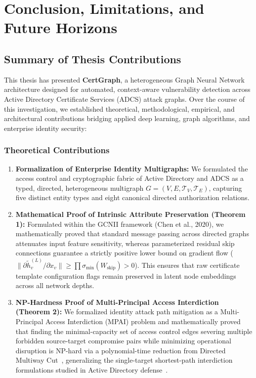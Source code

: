 \chapter{Conclusion, Limitations, and Future Horizons}
\label{ch:conclusion}

\section{Summary of Thesis Contributions}
This thesis has presented \textbf{CertGraph}, a heterogeneous Graph Neural Network architecture designed for automated, context-aware vulnerability detection across Active Directory Certificate Services (ADCS) attack graphs. Over the course of this investigation, we established theoretical, methodological, empirical, and architectural contributions bridging applied deep learning, graph algorithms, and enterprise identity security:

\subsection{Theoretical Contributions}
\begin{enumerate}
    \item \textbf{Formalization of Enterprise Identity Multigraphs:} We formulated the access control and cryptographic fabric of Active Directory and ADCS as a typed, directed, heterogeneous multigraph $G = (V, E, \mathcal{T}_V, \mathcal{T}_E)$, capturing five distinct entity types and eight canonical directed authorization relations.
    \item \textbf{Mathematical Proof of Intrinsic Attribute Preservation (Theorem 1):} Formulated within the GCNII framework (Chen et al., 2020), we mathematically proved that standard message passing across directed graphs attenuates input feature sensitivity, whereas parameterized residual skip connections guarantee a strictly positive lower bound on gradient flow ($\|\partial \tilde{h}_v^{(L)} / \partial x_v\| \ge \prod \sigma_{\min}(W_{\text{skip}}) > 0$). This ensures that raw certificate template configuration flags remain preserved in latent node embeddings across all network depths.
    \item \textbf{NP-Hardness Proof of Multi-Principal Access Interdiction (Theorem 2):} We formalized identity attack path mitigation as a Multi-Principal Access Interdiction (MPAI) problem and mathematically proved that finding the minimal-capacity set of access control edges severing multiple forbidden source-target compromise pairs while minimizing operational disruption is NP-hard via a polynomial-time reduction from Directed Multiway Cut~\cite{garg1994multiway}, generalizing the single-target shortest-path interdiction formulations studied in Active Directory defense~\cite{guo2022practical,guo2023scalable}.
\end{enumerate}

